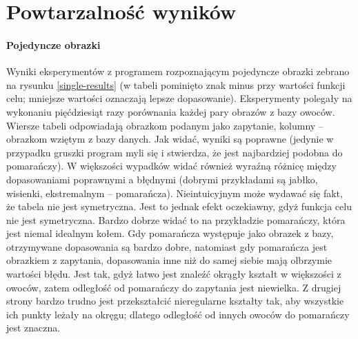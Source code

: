 \documentclass[a4paper,12pt,leqno]{article}
\begin{document}
\section{Powtarzalność wyników}

\paragraph{Pojedyncze obrazki} Wyniki eksperymentów z programem rozpoznającym pojedyncze obrazki zebrano na rysunku \ref{single-results} (w tabeli pominięto znak minus przy
wartości funkcji celu; mniejsze wartości oznaczają lepsze dopasowanie). Eksperymenty polegały na wykonaniu pięćdziesiąt razy porównania każdej pary obrazów z bazy owoców.
Wiersze tabeli odpowiadają obrazkom podanym jako zapytanie, kolumny -- obrazkom wziętym z bazy danych. Jak widać, wyniki są poprawne (jedynie w przypadku gruszki program myli
się i stwierdza, że jest najbardziej podobna do pomarańczy). W większości wypadków widać również wyraźną różnicę między dopasowaniami poprawnymi a błędnymi (dobrymi przykładami
są jabłko, wisienki, ekstremalnym -- pomarańcza). Nieintuicyjnym może wydawać się fakt, że tabela nie jest symetryczna. Jest to jednak efekt oczekiawny, gdyż funkcja celu nie
jest symetryczna. Bardzo dobrze widać to na przykładzie pomarańczy, która jest niemal idealnym kołem. Gdy pomarańcza występuje jako obrazek z bazy, otrzymywane dopasowania są
bardzo dobre, natomiast gdy pomarańcza jest obrazkiem z zapytania, dopasowania inne niż do samej siebie mają olbrzymie wartości błędu. Jest tak, gdyż łatwo jest znaleźć okrągły
kształt w większości z owoców, zatem odległość od pomarańczy do zapytania jest niewielka. Z drugiej strony bardzo trudno jest przekształcić nieregularne kształty tak, aby wszystkie
ich punkty leżały na okręgu; dlatego odległość od innych owoców do pomarańczy jest znaczna.
\end{document}
